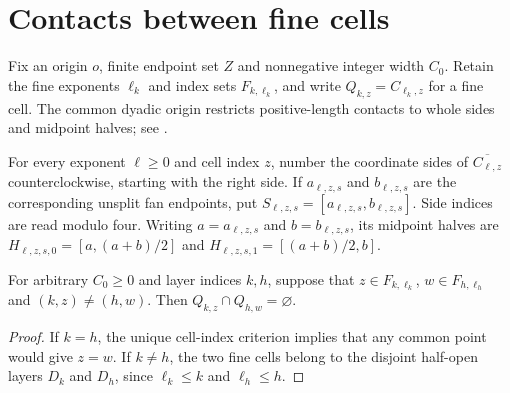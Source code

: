 \section{Contacts between fine cells}
\label{sec:area_law_cell_contacts}

Fix an origin $o$, finite endpoint set $Z$ and nonnegative integer width
$C_0$. Retain the fine exponents $\ell_k$ and index sets $F_{k,\ell_k}$,
and write $Q_{k,z}=C_{\ell_k,z}$ for a fine cell. The common
dyadic origin restricts positive-length contacts to whole sides and
midpoint halves; see \cite[Section~11]{OpenAI2026AreaLaw}.


\begin{definition}
    \label{def:area_law_dyadic_cell_side}
    \leanok
    For every exponent $\ell\ge0$ and cell index $z$, number the
    coordinate sides of $\overline{C_{\ell,z}}$ counterclockwise,
    starting with the right side. If $a_{\ell,z,s}$ and $b_{\ell,z,s}$
    are the corresponding unsplit fan endpoints, put
    $S_{\ell,z,s}=[a_{\ell,z,s},b_{\ell,z,s}]$.
    Side indices are read modulo four. Writing $a=a_{\ell,z,s}$ and
    $b=b_{\ell,z,s}$, its midpoint halves are
    $H_{\ell,z,s,0}=[a,(a+b)/2]$ and
    $H_{\ell,z,s,1}=[(a+b)/2,b]$.
\end{definition}

\begin{lemma}
    \label{thm:area_law_fine_cells_disjoint}
    \leanok
    For arbitrary $C_0\ge0$ and layer indices $k,h$, suppose that
    $z\in F_{k,\ell_k}$, $w\in F_{h,\ell_h}$ and $(k,z)\ne(h,w)$.
    Then $Q_{k,z}\cap Q_{h,w}=\varnothing$.
\end{lemma}
\begin{proof}\leanok
    If $k=h$, the unique cell-index criterion implies that any common
    point would give $z=w$. If $k\ne h$, the two fine cells belong to
    the disjoint half-open layers $D_k$ and $D_h$, since
    $\ell_k\le k$ and $\ell_h\le h$.
\end{proof}

